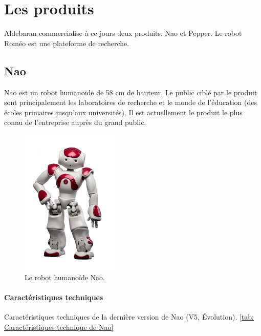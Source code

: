 \section{Les produits}
\label{Entreprise: Les produits}
Aldebaran commercialise à ce jours deux produits: Nao et Pepper. Le robot Roméo est une plateforme de recherche. 

\subsection{Nao}
\label{Entreprise: Les produits: Nao}
Nao est un robot humanoïde de 58 cm de hauteur. Le public ciblé par le produit sont principalement les laboratoires de recherche et le monde de l'éducation (des écoles primaires jusqu'aux universités). Il est actuellement le produit le plus connu de l'entreprise auprès du grand public. 

\begin{figure}[h]
	\centering\includegraphics[height=7cm]{images/nao.jpg}
	\caption{Le robot humanoïde Nao.}
	\label{fig:Robot humanoïde Nao}
\end{figure}

\paragraph{Caractéristiques techniques}
\label{Entreprise:Les produits: Nao: Caractéristiques techniques}
Caractéristiques techniques de la dernière version de Nao (V5, Évolution). \ref{tab: Caractéristiques technique de Nao}

